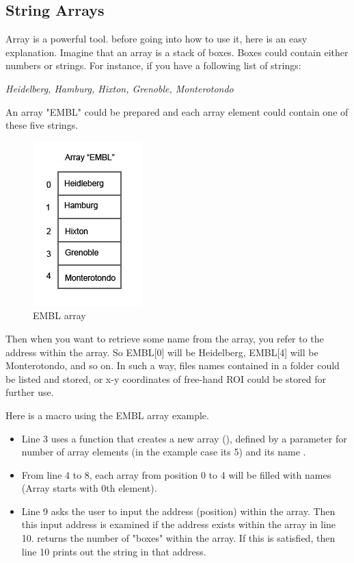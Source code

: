 \subsection{String Arrays}
Array is a powerful tool. before going into how to use it, here is an easy explanation. 
Imagine that an array is a stack of boxes. Boxes could contain either numbers or strings. 
For instance, if you have a following list of strings:

\textit{Heidelberg, Hamburg, Hixton, Grenoble, Monterotondo}

An array "EMBL" could be prepared and each array element could contain one of these five strings. 

\begin{figure}[htbp]
\begin{center}
\includegraphics[scale=0.6]{fig/fig2441_arrayScheme.jpg}
\caption{EMBL array}
\label{figEMBLarray}
\end{center}
\end{figure} 
 
Then when you want to retrieve some name from the array, you refer to the address within the array. 
So EMBL[0] will be Heidelberg, EMBL[4] will be Monterotondo, and so on. 
In such a way, files names contained in a folder could be listed and stored, 
or x-y coordinates of free-hand ROI could be stored for further use. 

Here is a macro using the EMBL array example. 



\begin{itemize}
\item Line 3 uses a function that creates a new array (),
defined by a parameter for number of array elements (in the example case its 5) and its name .
\item From line 4 to 8, each array from position 0 to 4 will be filled with
names (Array starts with 0th element).
\item Line 9 asks the user to input the address (position) within the array.
Then this input address is examined if the address exists within the
 array in line 10.  returns the number of "boxes"
within the array. If this is satisfied, then line 10 prints out the string in that address.
\end{itemize}

